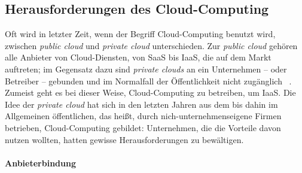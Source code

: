 \subsection{Herausforderungen des Cloud-Computing}

Oft wird in letzter Zeit, wenn der Begriff Cloud-Computing benutzt
wird, zwischen \emph{public cloud} und \emph{private cloud}
unterschieden. Zur \emph{public cloud} gehören alle Anbieter von
Cloud-Diensten, von \ac{SaaS} bis \ac{IaaS}, die auf dem Markt
auftreten; im Gegensatz dazu sind \emph{private clouds} an ein
Unternehmen -- oder Betreiber -- gebunden und im Normalfall der
Öffentlichkeit nicht zugänglich ~\cite{Wagener2010:Cloud-Computing}.
Zumeist geht es bei dieser Weise, Cloud-Computing zu betreiben, um
\ac{IaaS}. Die Idee der \emph{private cloud} hat sich in den letzten
Jahren aus dem bis dahin im Allgemeinen öffentlichen, das heißt, durch
nich-unternehmenseigene Firmen betrieben, Cloud-Computing gebildet:
Unternehmen, die die Vorteile davon nutzen wollten, hatten gewisse
Herausforderungen zu bewältigen.

\paragraph*{Anbieterbindung}
\label{sec:anbieterbindung}

